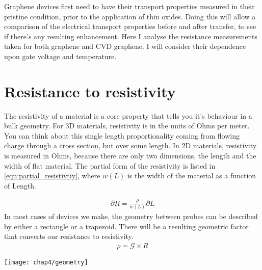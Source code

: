 \documentclass[../Matt_Gebert_Honours_Thesis.tex]{subfiles}
\begin{document}

Graphene devices first need to have their transport properties measured in their pristine condition, prior to the application of thin oxides. Doing this will allow a comparison of the electrical transport properties before and after transfer, to see if there's any resulting enhancement. Here I analyse the resistance measurements taken for both graphene and CVD graphene. I will consider their dependence upon gate voltage and temperature.

\section{Resistance to resistivity}
The resistivity of a material is a core property that tells you it's behaviour in a bulk geometry. For 3D materials, resistivity is in the units of Ohms per meter. You can think about this single length proportionality coming from flowing charge through a cross section, but over some length. In 2D materials, resistivity is measured in Ohms, because there are only two dimensions, the length and the width of flat material. The partial form of the resistivity is listed in \cref{eqn:partial_resistivtiy}, where $w(L)$ is the width of the material as a function of Length.\\
\begin{minipage}{0.5\textwidth}
	\begin{align}
	\partial R = \frac{\rho}{w(L)}\partial L\label{eqn:partial_resistivtiy}
	\end{align}
	In most cases of devices we make, the geometry between probes can be described by either a rectangle or a trapezoid. There will be a resulting geometric factor that converts our resistance to resistivity.
	\begin{align}
	\rho = \mathcal{G} \times R
	\end{align}
\end{minipage}
\begin{minipage}{0.5\textwidth}
	\centering
	\texttt{[image: chap4/geometry]}
\end{minipage}\\
\end{document}
